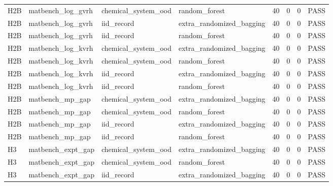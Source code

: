 \documentclass[10pt]{article}
\begin{document}
\begin{landscape}
\begin{longtable}{L{.32in}L{1.05in}L{1.2in}L{1.3in}L{.42in}L{.42in}L{.42in}L{.48in}}
H2B & matbench\_\allowbreak{}log\_\allowbreak{}gvrh & chemical\_\allowbreak{}system\_\allowbreak{}ood & random\_\allowbreak{}forest & 40 & 0 & 0 & PASS\\
H2B & matbench\_\allowbreak{}log\_\allowbreak{}gvrh & iid\_\allowbreak{}record & extra\_\allowbreak{}randomized\_\allowbreak{}bagging & 40 & 0 & 0 & PASS\\
H2B & matbench\_\allowbreak{}log\_\allowbreak{}gvrh & iid\_\allowbreak{}record & random\_\allowbreak{}forest & 40 & 0 & 0 & PASS\\
H2B & matbench\_\allowbreak{}log\_\allowbreak{}kvrh & chemical\_\allowbreak{}system\_\allowbreak{}ood & extra\_\allowbreak{}randomized\_\allowbreak{}bagging & 40 & 0 & 0 & PASS\\
H2B & matbench\_\allowbreak{}log\_\allowbreak{}kvrh & chemical\_\allowbreak{}system\_\allowbreak{}ood & random\_\allowbreak{}forest & 40 & 0 & 0 & PASS\\
H2B & matbench\_\allowbreak{}log\_\allowbreak{}kvrh & iid\_\allowbreak{}record & extra\_\allowbreak{}randomized\_\allowbreak{}bagging & 40 & 0 & 0 & PASS\\
H2B & matbench\_\allowbreak{}log\_\allowbreak{}kvrh & iid\_\allowbreak{}record & random\_\allowbreak{}forest & 40 & 0 & 0 & PASS\\
H2B & matbench\_\allowbreak{}mp\_\allowbreak{}gap & chemical\_\allowbreak{}system\_\allowbreak{}ood & extra\_\allowbreak{}randomized\_\allowbreak{}bagging & 40 & 0 & 0 & PASS\\
H2B & matbench\_\allowbreak{}mp\_\allowbreak{}gap & chemical\_\allowbreak{}system\_\allowbreak{}ood & random\_\allowbreak{}forest & 40 & 0 & 0 & PASS\\
H2B & matbench\_\allowbreak{}mp\_\allowbreak{}gap & iid\_\allowbreak{}record & extra\_\allowbreak{}randomized\_\allowbreak{}bagging & 40 & 0 & 0 & PASS\\
H2B & matbench\_\allowbreak{}mp\_\allowbreak{}gap & iid\_\allowbreak{}record & random\_\allowbreak{}forest & 40 & 0 & 0 & PASS\\
H3 & matbench\_\allowbreak{}expt\_\allowbreak{}gap & chemical\_\allowbreak{}system\_\allowbreak{}ood & extra\_\allowbreak{}randomized\_\allowbreak{}bagging & 40 & 0 & 0 & PASS\\
H3 & matbench\_\allowbreak{}expt\_\allowbreak{}gap & chemical\_\allowbreak{}system\_\allowbreak{}ood & random\_\allowbreak{}forest & 40 & 0 & 0 & PASS\\
H3 & matbench\_\allowbreak{}expt\_\allowbreak{}gap & iid\_\allowbreak{}record & extra\_\allowbreak{}randomized\_\allowbreak{}bagging & 40 & 0 & 0 & PASS\\

\end{longtable}
\end{landscape}
\end{document}
